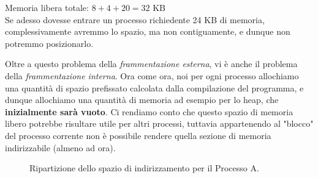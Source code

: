 \documentclass[12pt]{report}
\begin{document}
	Memoria libera totale: $8 + 4 + 20 = 32\text{ KB}$\\
	Se adesso dovesse entrare un processo richiedente 24 KB di memoria, complessivamente avremmo lo spazio, ma non contiguamente, e dunque non potremmo posizionarlo.
	\smallbreak
	
	Oltre a questo problema della \textit{frammentazione esterna}, vi è anche il problema della \textit{frammentazione interna}. Ora come ora, noi per ogni processo allochiamo una quantità di spazio prefissato calcolata dalla compilazione del programma, e dunque allochiamo una quantità di memoria ad esempio per lo heap, che \textbf{inizialmente sarà vuoto}. Ci rendiamo conto che questo spazio di memoria libero potrebbe risultare utile per altri processi, tuttavia appartenendo al "blocco" del processo corrente non è possibile rendere quella sezione di memoria indirizzabile (almeno ad ora).
	
	\begin{figure}[htbp]
		\centering
		\caption{Ripartizione dello spazio di indirizzamento per il Processo A.}
		\label{fig:spazio_indirizzamento_processo_a}
	\end{figure}
	
\end{document}
